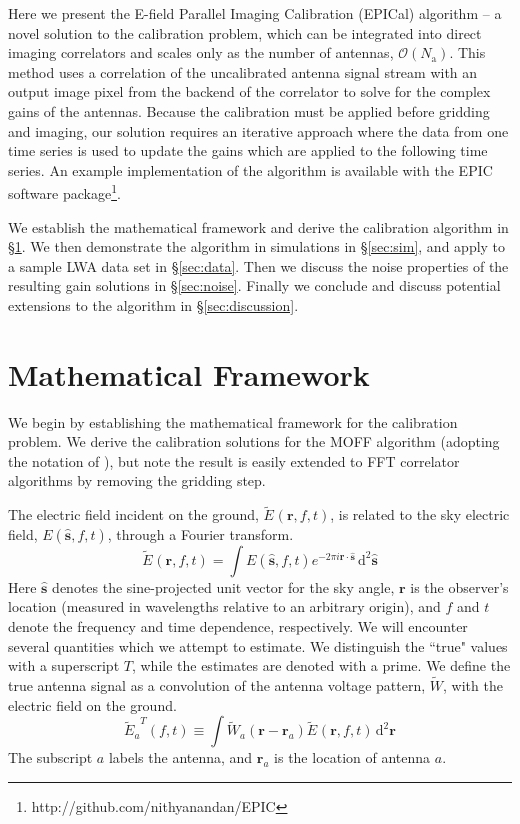 \documentclass[a4paper,fleqn,usenatbib]{../mnras}
\newcommand{\Nant}{\ensuremath{N_{\mathrm{a}}}}
\newcommand{\ra}{\ensuremath{\mathbf{r}_a}}
\newcommand{\beamr}{\ensuremath{\widetilde{W}}}
\newcommand{\Er}[1]{\ensuremath{\widetilde{E}_{#1}}}
\newcommand{\dif}{\mathrm{d}}
\begin{document}
Here we present the E-field Parallel Imaging Calibration (EPICal) algorithm -- a novel solution to the calibration problem, which can be integrated into direct imaging correlators and scales only as the number of antennas, $\mathcal{O}(\Nant)$. This method uses a correlation of the uncalibrated antenna signal stream with an output image pixel from the backend of the correlator to solve for the complex gains of the antennas. Because the calibration must be applied before gridding and imaging, our solution requires an iterative approach where the data from one time series is used to update the gains which are applied to the following time series. An example implementation of the algorithm is available with the EPIC software package\footnote{http://github.com/nithyanandan/EPIC}.

We establish the mathematical framework and derive the calibration algorithm in \S \ref{sec:math}. We then demonstrate the algorithm in simulations in \S \ref{sec:sim}, and apply to a sample LWA data set in \S \ref{sec:data}. Then we discuss the noise properties of the resulting gain solutions in \S \ref{sec:noise}. Finally we conclude and discuss potential extensions to the algorithm in \S \ref{sec:discussion}.

\section{Mathematical Framework}\label{sec:math}
We begin by establishing the mathematical framework for the calibration problem. We derive the calibration solutions for the MOFF algorithm (adopting the notation of \citealt{thy15c}), but note the result is easily extended to FFT correlator algorithms by removing the gridding step.

The electric field incident on the ground, $\Er{}(\mathbf{r},f,t)$, is related to the sky electric field, $E(\hat{\mathbf{s}},f,t)$, through a Fourier transform.
\begin{equation}
\Er{}(\mathbf{r},f,t) = \int E(\hat{\mathbf{s}},f,t) e^{-2\pi i \mathbf{r}\cdot \hat{\mathbf{s}}}\, \dif^2 \hat{\mathbf{s}}
\end{equation}
Here $\hat{\mathbf{s}}$ denotes the sine-projected unit vector for the sky angle, $\mathbf{r}$ is the observer's location (measured in wavelengths relative to an arbitrary origin), and $f$ and $t$ denote the frequency and time dependence, respectively. We will encounter several quantities which we attempt to estimate. We distinguish the ``true" values with a superscript $T$, while the estimates are denoted with a prime. We define the true antenna signal as a convolution of the antenna voltage pattern, $\beamr$, with the electric field on the ground.
\begin{equation}
\Er{a}^T(f,t) \equiv \int \beamr_a(\mathbf{r}-\ra) \Er{}(\mathbf{r},f,t) \, \dif^2 \mathbf{r}
\end{equation}
The subscript $a$ labels the antenna, and $\mathbf{r}_a$ is the location of antenna $a$.
\end{document}

